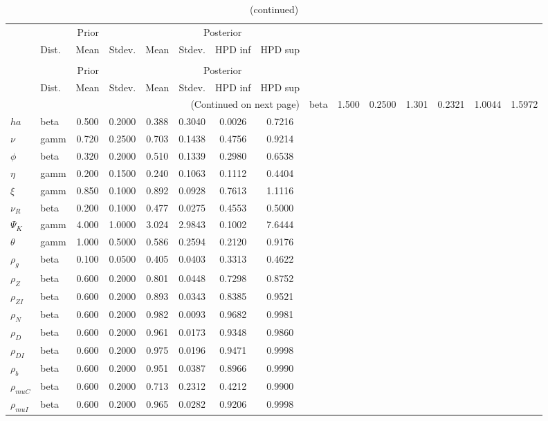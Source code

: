  
\begin{center}
\begin{longtable}{llcccccc} 
\caption{Results from Metropolis-Hastings (parameters)}
 \label{Table:MHPosterior:1}\\
\toprule 
  & \multicolumn{3}{c}{Prior}  &  \multicolumn{4}{c}{Posterior} \\
  \cmidrule(r{.75em}){2-4} \cmidrule(r{.75em}){5-8}
  & Dist. & Mean  & Stdev. & Mean & Stdev. & HPD inf & HPD sup\\
\midrule \endfirsthead 
\caption{(continued)}\\\toprule 
  & \multicolumn{3}{c}{Prior}  &  \multicolumn{4}{c}{Posterior} \\
  \cmidrule(r{.75em}){2-4} \cmidrule(r{.75em}){5-8}
  & Dist. & Mean  & Stdev. & Mean & Stdev. & HPD inf & HPD sup\\
\midrule \endhead 
\bottomrule \multicolumn{8}{r}{(Continued on next page)} \endfoot 
\bottomrule \endlastfoot 
${\sigma}$ & beta &   1.500 & 0.2500 &   1.301& 0.2321 &  1.0044 &  1.5972 \\ 
${ha}$ & beta &   0.500 & 0.2000 &   0.388& 0.3040 &  0.0026 &  0.7216 \\ 
$\nu$ & gamm &   0.720 & 0.2500 &   0.703& 0.1438 &  0.4756 &  0.9214 \\ 
${\phi}$ & beta &   0.320 & 0.2000 &   0.510& 0.1339 &  0.2980 &  0.6538 \\ 
${\eta}$ & gamm &   0.200 & 0.1500 &   0.240& 0.1063 &  0.1112 &  0.4404 \\ 
$\xi$ & gamm &   0.850 & 0.1000 &   0.892& 0.0928 &  0.7613 &  1.1116 \\ 
${\nu_R}$ & beta &   0.200 & 0.1000 &   0.477& 0.0275 &  0.4553 &  0.5000 \\ 
${\Psi_{K}}$ & gamm &   4.000 & 1.0000 &   3.024& 2.9843 &  0.1002 &  7.6444 \\ 
${\theta}$ & gamm &   1.000 & 0.5000 &   0.586& 0.2594 &  0.2120 &  0.9176 \\ 
${\rho_g}$ & beta &   0.100 & 0.0500 &   0.405& 0.0403 &  0.3313 &  0.4622 \\ 
${\rho_Z}$ & beta &   0.600 & 0.2000 &   0.801& 0.0448 &  0.7298 &  0.8752 \\ 
${\rho_{ZI}}$ & beta &   0.600 & 0.2000 &   0.893& 0.0343 &  0.8385 &  0.9521 \\ 
${\rho_N}$ & beta &   0.600 & 0.2000 &   0.982& 0.0093 &  0.9682 &  0.9981 \\ 
${\rho_D}$ & beta &   0.600 & 0.2000 &   0.961& 0.0173 &  0.9348 &  0.9860 \\ 
${\rho_{DI}}$ & beta &   0.600 & 0.2000 &   0.975& 0.0196 &  0.9471 &  0.9998 \\ 
${\rho_b}$ & beta &   0.600 & 0.2000 &   0.951& 0.0387 &  0.8966 &  0.9990 \\ 
${\rho_{muC}}$ & beta &   0.600 & 0.2000 &   0.713& 0.2312 &  0.4212 &  0.9900 \\ 
${\rho_{muI}}$ & beta &   0.600 & 0.2000 &   0.965& 0.0282 &  0.9206 &  0.9998 \\ 
\end{longtable}
 \end{center}
